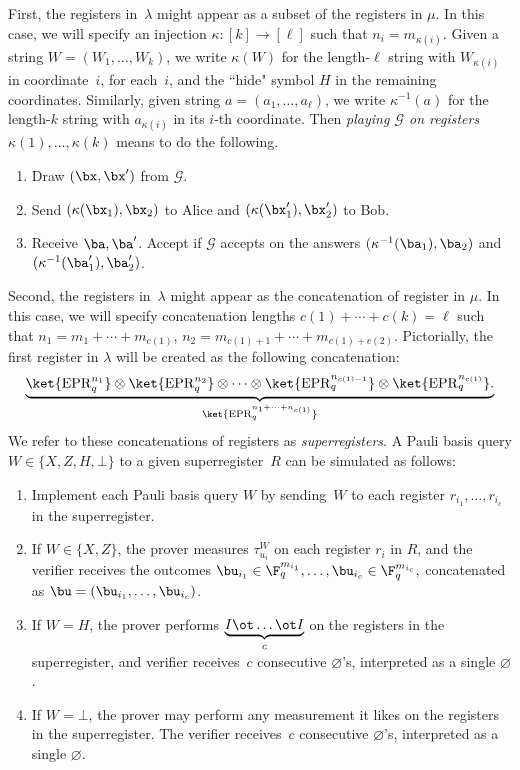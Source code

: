 \documentclass[11pt]{article}
\newcommand{\oktimes}[2]{\underbrace{#1 \ot \dots \ot #1}_{#2}}
\newcommand{\hideq}{H}
\newcommand{\noop}{\bot}
\newcommand{\game}{\mathscr{G}}
\begin{document}
\begin{notation}
First, the registers in~$\lambda$ might appear as a subset of the registers in $\mu$.
In this case, we will specify an injection $\kappa : [k] \rightarrow [\ell]$
such that $n_i = m_{\kappa(i)}$.
Given a string $W = (W_1, \ldots, W_k)$, we write $\kappa(W)$
for the length-$\ell$ string with $W_{\kappa(i)}$ in coordinate~$i$, for each~$i$,
and the ``hide" symbol $H$ in the remaining coordinates.
Similarly, given string $a = (a_1, \ldots, a_\ell)$,
we write $\kappa^{-1}(a)$ for the length-$k$ string with $a_{\kappa(i)}$ in its $i$-th coordinate.
Then \emph{playing $\game$ on registers $\kappa(1), \ldots, \kappa(k)$} means to do the following.
\begin{enumerate}
\item Draw $(\bx, \bx')$ from $\game$.
\item Send $(\kappa(\bx_1), \bx_2)$ to Alice and $(\kappa(\bx_1'), \bx_2')$ to Bob.
\item Receive $\ba, \ba'$. Accept if $\game$ accepts on the answers $(\kappa^{-1}(\ba_1), \ba_2)$ and $(\kappa^{-1}(\ba_1'), \ba_2')$.
\end{enumerate}
\end{notation}

\begin{notation}
Second, the registers in~$\lambda$ might appear as the concatenation of register in $\mu$.
In this case, we will specify concatenation lengths $c(1) + \cdots + c(k) = \ell$ such that
$n_1 = m_1 + \cdots + m_{c(1)}$, $n_2 = m_{c(1) + 1} + \cdots + m_{c(1) + c(2)}$.
Pictorially, the first register in $\lambda$ will be created as the following concatenation:
\begin{equation*}
\underbrace{
\ket{\mathrm{EPR}_q^{n_1}} \otimes \ket{\mathrm{EPR}_q^{n_2}} \otimes \cdots
\otimes \ket{\mathrm{EPR}_q^{n_{c(1)-1}}} \otimes \ket{\mathrm{EPR}_q^{n_{c(1)}}}. 
}_{\ket{\mathrm{EPR}_q^{n_1 + \cdots + n_{c(1)}}}}
\end{equation*}
We refer to these concatenations of registers as \emph{superregisters}.
A Pauli basis query $W \in \{X, Z, \hideq, \noop\}$ to a given superregister~$R$ can be simulated as follows:
\begin{enumerate}
\item  Implement each Pauli basis query $W$ by sending~$W$ to
  each register $r_{i_1}, \ldots, r_{i_{c}}$ in the superregister.
\item If $W \in \{X, Z\}$, the prover measures $\tau^W_{u_i}$ on each
  register $r_i$ in $R$, and the verifier receives the outcomes
$
\bu_{i_1} \in \F_q^{m_{i_1}}, \ldots, \bu_{i_{c}} \in \F_q^{m_{i_{c}}},
$
concatenated as $\bu = (\bu_{i_1}, \ldots, \bu_{i_c})$.
\item If $W = \hideq $, the prover performs $\oktimes{I}{c}$ on
  the registers in the superregister, and verifier receives~$c$ consecutive $\varnothing$'s, interpreted as a single $\varnothing$.
\item If $W = \bot$, the prover may perform any measurement it likes
  on the registers in the superregister.
  The verifier receives~$c$ consecutive $\varnothing$'s, interpreted as a single $\varnothing$.
\end{enumerate}
\end{notation}
\end{document}
